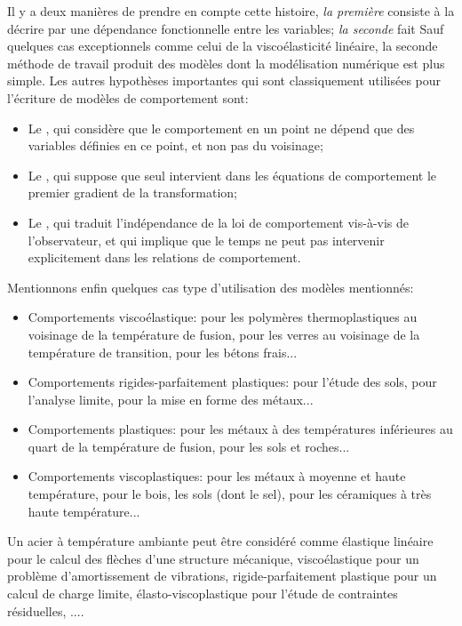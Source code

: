 Il y a deux manières de prendre en compte cette histoire, \emph{la première} consiste à la décrire par une dépendance fonctionnelle entre les variables; \emph{la seconde} fait 
\medskipvm
Sauf quelques cas exceptionnels comme celui de la viscoélasticité linéaire, la seconde méthode de travail produit des modèles dont la modélisation numérique est plus simple.
\medskipvm
Les autres hypothèses importantes qui sont classiquement utilisées pour l'écriture de modèles de comportement sont:
\begin{itemize}
  \item Le , qui considère que le comportement en un point ne dépend que des variables définies en ce point, et non pas du voisinage;
  \item Le , qui suppose que seul intervient dans les équations de comportement le premier gradient de la transformation;
  \item Le , qui traduit l'indépendance de la loi de comportement vis-à-vis de l'observateur, et qui implique que le temps ne peut pas intervenir explicitement dans les relations de comportement.
\end{itemize}

\medskip
Mentionnons enfin quelques cas type d'utilisation des modèles mentionnés:
\begin{itemize}
  \item Comportements viscoélastique: pour les polymères thermoplastiques au voisinage de la température de fusion, pour les verres au voisinage de la température de transition, pour les bétons frais...
  \item Comportements rigides-parfaitement plastiques: pour l'étude des sols, pour l'analyse limite, pour la mise en forme des métaux...
  \item Comportements plastiques: pour les métaux à des températures inférieures au quart de la température de fusion, pour les sols et roches...
  \item Comportements viscoplastiques: pour les métaux à moyenne et haute température,
	pour le bois, les sols (dont le sel), pour les céramiques à très haute température...
\end{itemize}

Un acier à température ambiante peut être considéré comme élastique linéaire pour le calcul des flèches d'une structure mécanique, viscoélastique pour un problème d'amortissement de vibrations, rigide-parfaitement plastique pour un calcul de charge limite, élasto-viscoplastique pour l'étude de contraintes résiduelles, ....

